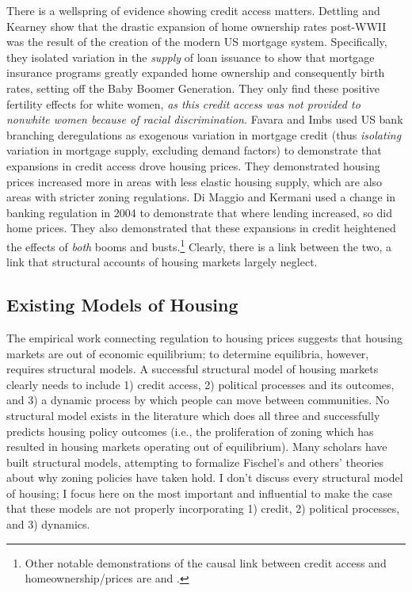 \documentclass{article}[11pt]
\begin{document}
There is a wellspring of evidence showing credit access matters. Dettling and Kearney show that the drastic expansion of home ownership rates post-WWII was the result of the creation of the modern US mortgage system. \citep{dettling2025did} Specifically, they isolated variation in the \textit{supply} of loan issuance to show that mortgage insurance programs greatly expanded home ownership and consequently birth rates, setting off the Baby Boomer Generation. They only find these positive fertility effects for white women, \textit{as this credit access was not provided to nonwhite women because of racial discrimination.} Favara and Imbs used US bank branching deregulations as exogenous variation in mortgage credit (thus \textit{isolating} variation in mortgage supply, excluding demand factors) to demonstrate that expansions in credit access drove housing prices. \citep{favara2015credit} They demonstrated housing prices increased more in areas with less elastic housing supply, which are also areas with stricter zoning regulations. Di Maggio and Kermani used a change in banking regulation in 2004 to demonstrate that where lending increased, so did home prices. \citep{di2017credit} They also demonstrated that these expansions in credit heightened the effects of \textit{both} booms and busts.\footnote{Other notable demonstrations of the causal link between credit access and homeownership/prices are \cite{fetter2013mortgage} and \cite{adelino2012credit}.} Clearly, there is a link between the two, a link that structural accounts of housing markets largely neglect.

	\subsection{Existing Models of Housing}
The empirical work connecting regulation to housing prices suggests that housing markets are out of economic equilibrium; to determine equilibria, however, requires structural models. A successful structural model of housing markets clearly needs to include 1) credit access, 2) political processes and its outcomes, and 3) a dynamic process by which people can move between communities. No structural model exists in the literature which does all three and successfully predicts housing policy outcomes (i.e., the proliferation of zoning which has resulted in housing markets operating out of equilibrium). Many scholars have built structural models, attempting to formalize Fischel's and others' theories about why zoning policies have taken hold. I don't discuss every structural model of housing; I focus here on the most important and influential to make the case that these models are not properly incorporating 1) credit, 2) political processes, and 3) dynamics.
\end{document}
